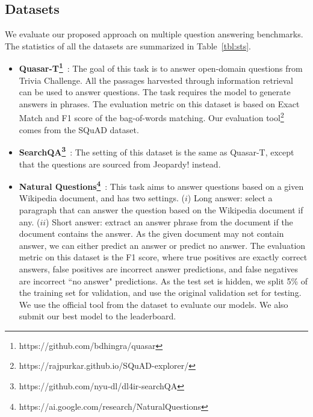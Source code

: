 \subsection{Datasets}
We evaluate our proposed approach on 
multiple question answering benchmarks. 
The statistics of all the datasets are summarized in Table~\ref{tbl:sts}.
\begin{itemize}[itemsep=1pt,topsep=2pt,leftmargin=12pt]
\item
\textbf{Quasar-T\footnote{https://github.com/bdhingra/quasar}}~\citep{dhingra2017quasar}: The goal of this task is to answer open-domain questions from Trivia Challenge. All the passages harvested through information retrieval can be used to answer questions. The task requires the model to generate answers in phrases. The evaluation metric on this dataset is based on Exact Match and F1 score of the bag-of-words matching. 
Our evaluation tool\footnote{https://rajpurkar.github.io/SQuAD-explorer/} comes from the SQuAD dataset.
\item
\textbf{SearchQA\footnote{https://github.com/nyu-dl/dl4ir-searchQA}}~\citep{dunn2017searchqa}: The setting of this dataset is the same as Quasar-T, except that the questions are sourced from Jeopardy! instead.
\item
\textbf{Natural Questions\footnote{https://ai.google.com/research/NaturalQuestions}}~\citep{kwiatkowski2019natural}: This task aims to answer questions based on a given Wikipedia document, and has two settings.
($i$) Long answer: select a paragraph that can answer the question based on the Wikipedia document if any.
($ii$) Short answer: extract an answer phrase from the document if the document contains the answer.
As the given document may not contain answer, we can either predict an answer or predict no answer. 
The evaluation metric on this dataset is the F1 score, where
true positives are exactly correct answers, false positives are incorrect answer predictions, and false negatives are incorrect ``no answer" predictions.
As the test set is hidden, we split 5\% of the training set for validation, and use the original validation set for testing.
We use the official tool from the dataset to evaluate our models. We also submit our best  model to the leaderboard.
\end{itemize}


